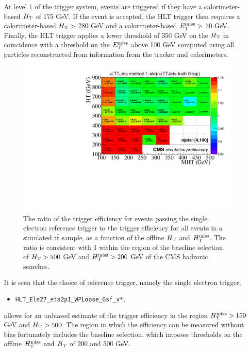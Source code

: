 At level 1 of the trigger system, events are triggered if they have a calorimeter-based $H_{\rm T}$ of 175 GeV. If the event is accepted, the HLT trigger then requires a calorimeter-based $H_{\rm T}>$ 280 GeV and a calorimeter-based $E_{\text{T}}^{\rm miss}>$ 70 GeV. Finally, the HLT trigger applies a lower threshold of 350 GeV on the $H_{\rm T}$ in coincidence with a threshold on the $E_{\text{T}}^{\rm miss}$ above 100 GeV computed using all particles reconstructed from information from the tracker and calorimeters.

\begin{figure}[tb!]
  \begin{center}
    \includegraphics[width=0.95\linewidth]{figures/trigger/EfficiencyRatioMethodTruth.pdf}
    \caption{
      The ratio of the trigger efficiency for events passing the single
      electron reference trigger to the trigger efficiency for all
      events in a simulated t$\bar{\text{t}}$ sample, as a function of the offline $H_{\rm T}$
      and $H_{\text{T}}^{\rm miss}$. The ratio is consistent with 1 within the region of
      the baseline selection of $H_{\rm T}>500$ GeV and $H_{\text{T}}^{\rm miss}>200$ GeV of the CMS hadronic searches.
    }
    \label{fig:2dEffRatio}
  \end{center}
\end{figure}
It is seen that the choice of reference trigger, namely the single electron trigger,
\begin{itemize}
  \item \texttt{HLT\_Ele27\_eta2p1\_WPLoose\_Gsf\_v*}, 
\end{itemize}
allows for an unbiased estimate of the trigger efficiency in the region $H_{\text{T}}^{\rm miss}>150$ GeV and $H_{\rm T}>500$. The region in which the efficiency can be measured without bias fortunately includes the baseline selection, which imposes thresholds on the offline $H_{\text{T}}^{\rm miss}$ and $H_{\rm T}$ of 200 and 500 GeV. 


